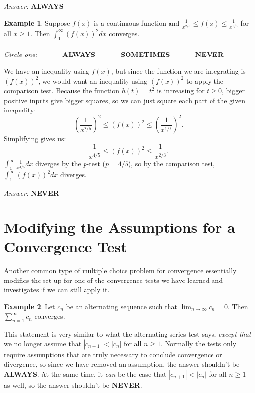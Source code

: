 \documentclass{article}
\theoremstyle{definition} %
\newtheorem{example}{Example} %
\begin{document}
\textit{Answer:} \textbf{ALWAYS} \\

\begin{example}
    Suppose $f(x)$ is a continuous function and $\frac{1}{x^{2/5}} \leq f(x) \leq \frac{1}{x^{1/3}}$ for all $x \geq 1$. Then $\int_1^\infty (f(x))^2dx$ converges. \\\\ 
    \textit{Circle one:} $\quad\quad\quad$ \textbf{ALWAYS} $\quad\quad\quad$ \textbf{SOMETIMES} $\quad\quad\quad$ \textbf{NEVER}
\end{example}

\vspace{20pt}

We have an inequality using $f(x)$, but since the function we are integrating is $(f(x))^2$, we would want an inequality using $(f(x))^2$ to apply the comparison test. Because the function $h(t) = t^2$ is increasing for $t \geq 0$, bigger positive inputs give bigger squares, so we can just square each part of the given inequality: $$\left(\frac{1}{x^{2/5}}\right)^2 \leq (f(x))^2 \leq \left(\frac{1}{x^{1/3}}\right)^2.$$ Simplifying gives us: $$\frac{1}{x^{4/5}} \leq (f(x))^2 \leq \frac{1}{x^{2/3}}.$$ $\displaystyle\int_1^\infty \frac{1}{x^{4/5}}dx$ diverges by the $p$-test ($p = 4/5$), so by the comparison test, $\displaystyle\int_1^\infty (f(x))^2dx$ diverges.  

\vspace{15pt}

\textit{Answer:} \textbf{NEVER} 

\section{Modifying the Assumptions for a Convergence Test}

Another common type of multiple choice problem for convergence essentially modifies the set-up for one of the convergence tests we have learned and investigates if we can still apply it.

\begin{example}\label{ast_example}
    Let $c_n$ be an alternating sequence such that $\displaystyle\lim_{n \to \infty} c_n = 0$. Then $\displaystyle\sum_{n=1}^\infty c_n$ converges. 
\end{example}

\vspace{20pt}

This statement is very similar to what the alternating series test says, \textit{except that} we no longer assume that $|c_{n+1}| < |c_n|$ for all $n \geq 1$. Normally the tests only require assumptions that are truly necessary to conclude convergence or divergence, so since we have removed an assumption, the answer shouldn't be \textbf{ALWAYS}. At the same time, it \textit{can} be the case that $|c_{n+1}| < |c_n|$ for all $n \geq 1$ as well, so the answer shouldn't be \textbf{NEVER}. \\
\end{document}

